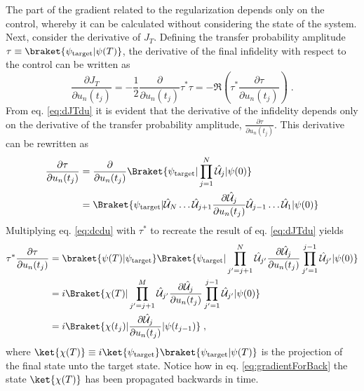 The part of the gradient related to the regularization depends only on the control, whereby it can be calculated without considering the state of the system.\\ 
Next, consider the derivative of $J_T$. Defining the transfer probability amplitude $\tau \equiv \braket{\psi_{\mathrm{target}} | \psi (T)}$, the derivative of the final infidelity with respect to the control can be written as 
\begin{equation}
	\frac{\partial J_T}{\partial u_n (t_j)} = - \frac{1}{2} \frac{\partial}{\partial u_n (t_j)}  \tau^* \tau   = - \Re \left( \tau^* \frac{\partial \tau}{\partial u_n (t_j)} \right) \; .
	\label{eq:dJTdu}
\end{equation}
From eq. \eqref{eq:dJTdu} it is evident that the derivative of the infidelity depends only on the derivative of the transfer probability amplitude, $\frac{\partial \tau}{\partial u_n (t_j)}$. This derivative can be rewritten as
\begin{align}
	\frac{\partial \tau}{\partial u_n (t_j)} &= \frac{\partial }{\partial u_n (t_j)} \Braket{\psi_{\mathrm{target}} | \prod_{j = 1}^{N} \hat{\mathcal{U}}_j | \psi (0)} \nonumber \\
	&= \Braket{\psi_{\mathrm{target}} | \hat{\mathcal{U}}_N \ldots \hat{\mathcal{U}}_{j+1} \frac{\partial \hat{\mathcal{U}}_{j}}{\partial u_n (t_j)} \hat{\mathcal{U}}_{j-1} \ldots \hat{\mathcal{U}}_{1} | \psi (0)}
	\label{eq:dcdu}
\end{align}
Multiplying eq. \eqref{eq:dcdu} with $\tau^*$ to recreate the result of eq. \eqref{eq:dJTdu} yields
\begin{align}
	\tau^* \frac{\partial \tau}{\partial u_n (t_j)} &=  \braket{\psi(T) | \psi_{\mathrm{target}}} \Braket{\psi_{\mathrm{target}} | \prod_{j' = j +1}^{N} \hat{\mathcal{U}}_{j '} \frac{\partial \hat{\mathcal{U}}_{j}}{\partial u_n (t_j)} \prod_{j' = 1}^{ j-1} \hat{\mathcal{U}}_{j '} | \psi (0)} \\
	&= i \Braket{\chi (T) | \prod_{j' = j +1}^{M} \hat{\mathcal{U}}_{j '} \frac{\partial \hat{\mathcal{U}}_{j}}{\partial u_n (t_j)} \prod_{j' = 1}^{ j-1} \hat{\mathcal{U}}_{j '} | \psi (0)} \\
	&= i \Braket{\chi (t_j) |  \frac{\partial \hat{\mathcal{U}}_{j}}{\partial u_n (t_j)} | \psi (t_{j-1})} \; ,
	\label{eq:gradientForBack}
\end{align}
where $\ket{\chi (T)} \equiv i \ket{\psi_{\mathrm{target}}} \braket{\psi_{\mathrm{target}} | \psi (T)}$ is the projection of the final state unto the target state. Notice how in eq. \eqref{eq:gradientForBack} the state $\ket{\chi (T)}$ has been propagated backwards in time.\\ 

